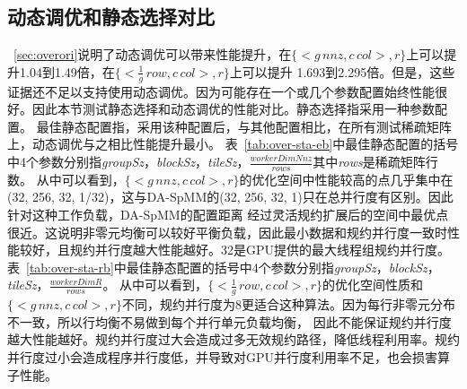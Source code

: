 \subsection{动态调优和静态选择对比}\label{sec:dystd}
~\ref{sec:overori}说明了动态调优可以带来性能提升，在$\{<g\,nnz , c\,col>,r\}$上可以提升1.04到1.49倍，在$\{<\frac{1}{g}\,row , c\,col>,r\}$上可以提升
1.693到2.295倍。但是，这些证据还不足以支持使用动态调优。因为可能存在一个或几个参数配置始终性能很好。因此本节测试静态选择和动态调优的性能对比。静态选择指采用一种参数配置。
最佳静态配置指，采用该种配置后，与其他配置相比，在所有测试稀疏矩阵上，动态调优与之相比性能提升最小。
表~\ref{tab:over-sta-eb}中最佳静态配置的括号中4个参数分别指\textit{groupSz}，\textit{blockSz}，\textit{tileSz}，$\frac{workerDimNnz}{rows}$其中\textit{rows}是稀疏矩阵行数。
从中可以看到，$\{<g\,nnz , c\,col>,r\}$的优化空间中性能较高的点几乎集中在(32, 256, 32, 1/32)，这与DA-SpMM的(32, 256, 32, 1)只在总并行度有区别。因此针对这种工作负载，DA-SpMM的配置距离
经过灵活规约扩展后的空间中最优点很近。这说明非零元均衡可以较好平衡负载，因此最小数据和规约并行度一致时性能较好，且规约并行度越大性能越好。32是GPU提供的最大线程组规约并行度。
表~\ref{tab:over-sta-rb}中最佳静态配置的括号中4个参数分别指\textit{groupSz}，\textit{blockSz}，\textit{tileSz}，$\frac{workerDimR}{rows}$。
从中可以看到，$\{<\frac{1}{g}\,row , c\,col>,r\}$的优化空间性质和$\{<g\,nnz , c\,col>,r\}$不同，规约并行度为8更适合这种算法。因为每行非零元分布不一致，所以行均衡不易做到每个并行单元负载均衡，
因此不能保证规约并行度越大性能越好。规约并行度过大会造成过多无效规约路径，降低线程利用率。规约并行度过小会造成程序并行度低，并导致对GPU并行度利用率不足，也会损害算子性能。
